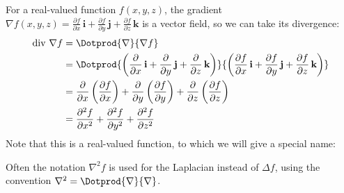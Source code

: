For a real-valued function $f(x,y,z)$, the gradient $\nabla f(x,y,z) =\frac{\partial f}{\partial x}\,\textbf{i} + \frac{\partial f}{\partial y}\,\textbf{j} + \frac{\partial f}{\partial z}\,\textbf{k}$ is a vector field, so we can take its divergence:
\begin{align*}
 \text{div }\nabla f &= \Dotprod{\nabla}{\nabla f}\\
  &= \Dotprod{ \left( \frac{\partial}{\partial x}\,\textbf{i} + \frac{\partial}{\partial y}\,\textbf{j} +
  \frac{\partial}{\partial z}\,\textbf{k} \right) }{\left( \frac{\partial f}{\partial x}\,\textbf{i} +
  \frac{\partial f}{\partial y}\,\textbf{j} + \frac{\partial f}{\partial z}\,\textbf{k} \right) }\\
  &= \frac{\partial}{\partial x}\left( \frac{\partial f}{\partial x} \right) +
   \frac{\partial}{\partial y}\left( \frac{\partial f}{\partial y} \right) +
   \frac{\partial}{\partial z}\left( \frac{\partial f}{\partial z} \right)\\
  &= \frac{\partial^2 f}{\partial x^2} + \frac{\partial^2 f}{\partial y^2} + \frac{\partial^2 f}{\partial z^2}
\end{align*}
Note that this is a real-valued function, to which we will give a special name:


Often the notation $\nabla^2 f$ is used for the Laplacian instead of $\Delta f$, using the convention $\nabla^2 = \Dotprod{\nabla}{\nabla}$.\index{$\Delta$}

